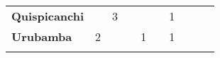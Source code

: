 \begin{tabular}{lccccccccc}
	\textbf{Quispicanchi}  & \cellcolor[HTML]{FCC46C}                & 3			  &\cellcolor[HTML]{FCC46C}                    & \cellcolor[HTML]{FCC46C}                   &\cellcolor[HTML]{FCC46C}                    &1                   &\cellcolor[HTML]{FCC46C}                                             & \cellcolor[HTML]{FCC46C}                     &\cellcolor[HTML]{FCC46C} \\
	\textbf{Urubamba}      & 2                   & \cellcolor[HTML]{FCC46C}                          &\cellcolor[HTML]{FCC46C}                    & 1                   &\cellcolor[HTML]{FCC46C}                                  & 1                    & \cellcolor[HTML]{FCC46C}                                             &\cellcolor[HTML]{FCC46C}                     & \cellcolor[HTML]{FCC46C} \\
	& \multicolumn{1}{l}{}                        & \multicolumn{1}{l}{}      & \multicolumn{1}{l}{}                         & \multicolumn{1}{l}{}                         & \multicolumn{1}{l}{}                         & \multicolumn{1}{l}{}                        & \multicolumn{1}{l}{}                         & \multicolumn{1}{l}{}                         & \multicolumn{1}{l}{}    
\end{tabular}